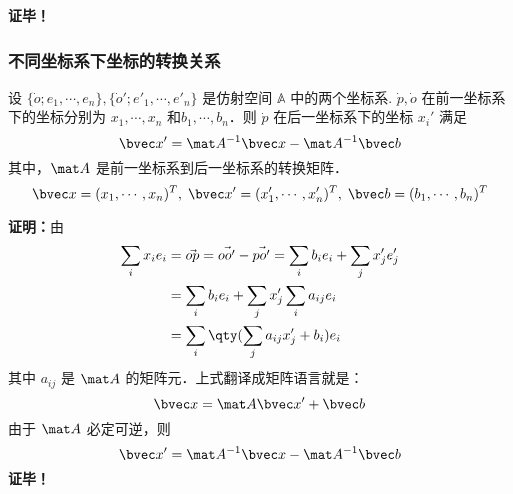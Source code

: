 \textbf{证毕！}
\subsubsection{不同坐标系下坐标的转换关系}
\begin{theorem}{}
设 $\{\dot o;e_1,\cdots,e_n\},\{\dot o';e'_1,\cdots,e'_n\}$ 是仿射空间 $\mathbb A$ 中的两个坐标系. $\dot p,\dot o$ 在前一坐标系下的坐标分别为 $x_1,\cdots,x_n$ 和$b_1,\cdots,b_n$．则 $\dot p$ 在后一坐标系下的坐标 $x_i'$ 满足
\begin{equation}
\bvec x'=\mat A^{-1}\bvec x-\mat A^{-1}\bvec b
\end{equation}
 其中，$\mat A$ 是前一坐标系到后一坐标系的转换矩阵．
 \begin{equation}
 \bvec x=(x_1,\cdots,x_n)^T,\;\bvec x'=(x_1',\cdots,x_n')^T,\;\bvec b=(b_1,\cdots,b_n)^T
 \end{equation}
 
\end{theorem}
\textbf{证明：}由
\begin{equation}
\begin{aligned}
\sum_{i}x_ie_i&=\vec{op}=\vec{oo'}-\vec{po'}=\sum_{i}b_ie_i+\sum_{j}x'_je'_j\\
&=\sum_i b_ie_i+\sum_{j}x'_j\sum_{i}a_{ij}e_i\\
&=\sum_{i}\qty(\sum_{j}a_{ij}x_j'+b_i)e_i
\end{aligned}
\end{equation}
其中 $a_{ij}$ 是 $\mat A$ 的矩阵元．上式翻译成矩阵语言就是：
\begin{equation}
\bvec x=\mat A\bvec x'+\bvec b
\end{equation}
由于 $\mat A$ 必定可逆，则
\begin{equation}
\bvec x'=\mat A^{-1}\bvec x-\mat A^{-1}\bvec b
\end{equation}
\textbf{证毕！}

